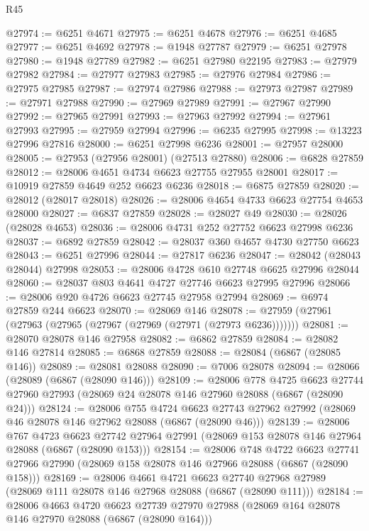 \begin{lexlean}{R45}
\begin{coremodule}
{@27974 := @6251 @4671
@27975 := @6251 @4678
@27976 := @6251 @4685
@27977 := @6251 @4692
@27978 := @1948 @27787
@27979 := @6251 @27978
@27980 := @1948 @27789
@27982 := @6251 @27980 @22195
@27983 := @27979 @27982
@27984 := @27977 @27983
@27985 := @27976 @27984
@27986 := @27975 @27985
@27987 := @27974 @27986
@27988 := @27973 @27987
@27989 := @27971 @27988
@27990 := @27969 @27989
@27991 := @27967 @27990
@27992 := @27965 @27991
@27993 := @27963 @27992
@27994 := @27961 @27993
@27995 := @27959 @27994
@27996 := @6235 @27995
@27998 := @13223 @27996 @27816
@28000 := @6251 @27998 @6236
@28001 := @27957 @28000
@28005 := @27953 (@27956 @28001) (@27513 @27880)
@28006 := @6828 @27859
@28012 := @28006 @4651 @4734 @6623 @27755 @27955 @28001
@28017 := @10919 @27859 @4649 @252 @6623 @6236
@28018 := @6875 @27859
@28020 := @28012 (@28017 @28018)
@28026 := @28006 @4654 @4733 @6623 @27754 @4653 @28000
@28027 := @6837 @27859
@28028 := @28027 @49
@28030 := @28026 (@28028 @4653)
@28036 := @28006 @4731 @252 @27752 @6623 @27998 @6236
@28037 := @6892 @27859
@28042 := @28037 @360 @4657 @4730 @27750 @6623
@28043 := @6251 @27996
@28044 := @27817 @6236
@28047 := @28042 (@28043 @28044) @27998
@28053 := @28006 @4728 @610 @27748 @6625 @27996 @28044
@28060 := @28037 @803 @4641 @4727 @27746 @6623 @27995 @27996
@28066 := @28006 @920 @4726 @6623 @27745 @27958 @27994
@28069 := @6974 @27859 @244 @6623
@28070 := @28069 @146
@28078 := @27959 (@27961 (@27963 (@27965 (@27967 (@27969 (@27971 (@27973 @6236)))))))
@28081 := @28070 @28078 @146 @27958
@28082 := @6862 @27859
@28084 := @28082 @146 @27814
@28085 := @6868 @27859
@28088 := @28084 (@6867 (@28085 @146))
@28089 := @28081 @28088
@28090 := @7006 @28078
@28094 := @28066 (@28089 (@6867 (@28090 @146)))
@28109 := @28006
    @778
    @4725
    @6623
    @27744
    @27960
    @27993
    (@28069 @24 @28078 @146 @27960 @28088 (@6867 (@28090 @24)))
@28124 := @28006
    @755
    @4724
    @6623
    @27743
    @27962
    @27992
    (@28069 @46 @28078 @146 @27962 @28088 (@6867 (@28090 @46)))
@28139 := @28006
    @767
    @4723
    @6623
    @27742
    @27964
    @27991
    (@28069 @153 @28078 @146 @27964 @28088 (@6867 (@28090 @153)))
@28154 := @28006
    @748
    @4722
    @6623
    @27741
    @27966
    @27990
    (@28069 @158 @28078 @146 @27966 @28088 (@6867 (@28090 @158)))
@28169 := @28006
    @4661
    @4721
    @6623
    @27740
    @27968
    @27989
    (@28069 @111 @28078 @146 @27968 @28088 (@6867 (@28090 @111)))
@28184 := @28006
    @4663
    @4720
    @6623
    @27739
    @27970
    @27988
    (@28069 @164 @28078 @146 @27970 @28088 (@6867 (@28090 @164)))
}
\end{coremodule}
\end{lexlean}
